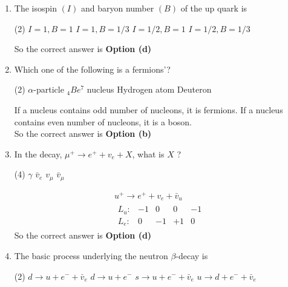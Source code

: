 \begin{enumerate}
	\item The isospin $(I)$ and baryon number $(B)$ of the up quark is
	{}
	 \begin{tasks}(2)
		\task[\textbf{a.}]$I=1, B=1$
		\task[\textbf{b.}]$I=1, B=1 / 3$
		\task[\textbf{c.}]$I=1 / 2, B=1$
		\task[\textbf{d.}]$I=1 / 2, B=1 / 3$ 
	\end{tasks}
\begin{answer}
	So the correct answer is \textbf{Option (d)}
\end{answer}
	\item  Which one of the following is a fermions'?
	{}
	 \begin{tasks}(2)
		\task[\textbf{a.}]$\alpha$-particle
		\task[\textbf{b.}]${ }_4 B e^7$ nucleus
		\task[\textbf{c.}]Hydrogen atom
		\task[\textbf{d.}]Deuteron 
	\end{tasks}
\begin{answer}
	If a nucleus contains odd number of nucleons, it is fermions. If a nucleus contains even number of nucleons, it is a boson.\\
	So the correct answer is \textbf{Option (b)}
\end{answer}
	\item  In the decay, $\mu^{+} \rightarrow e^{+}+v_e+X$, what is $X$ ?
	{}
	 \begin{tasks}(4)
		\task[\textbf{a.}]$\gamma$
		\task[\textbf{b.}]$\bar{v}_e$
		\task[\textbf{c.}]$v_\mu$
		\task[\textbf{d.}]$\bar{v}_\mu$ 
	\end{tasks}
\begin{answer}
	\begin{align*}
	u^{+} \rightarrow e^{+}+v_e+\bar{v}_u\\
	\begin{array}{rrrrr}
	L_u: & -1 & 0 & 0 & -1 \\
	L_e: & 0 & -1 & +1 & 0
	\end{array}
	\end{align*}
	So the correct answer is \textbf{Option (d)}
\end{answer}
	\item  The basic process underlying the neutron $\beta$-decay is
	{}
	 \begin{tasks}(2)
		\task[\textbf{a.}]$d \rightarrow u+e^{-}+\bar{v}_e$
		\task[\textbf{b.}]$d \rightarrow u+e^{-}$
		\task[\textbf{c.}]$s \rightarrow u+e^{-}+\bar{v}_e$
		\task[\textbf{d.}]$u \rightarrow d+e^{-}+\bar{v}_e$ 
	\end{tasks}

\end{enumerate}
